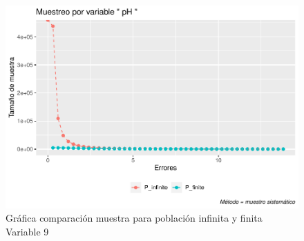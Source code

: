 \documentclass[
]{article}
\begin{document}
\begin{figure}
\centering
\includegraphics{1_examen_solucion_files/figure-latex/grafica sys9-1.pdf}
\caption{Gráfica comparación muestra para población infinita y finita
Variable 9}
\end{figure}
\end{document}
